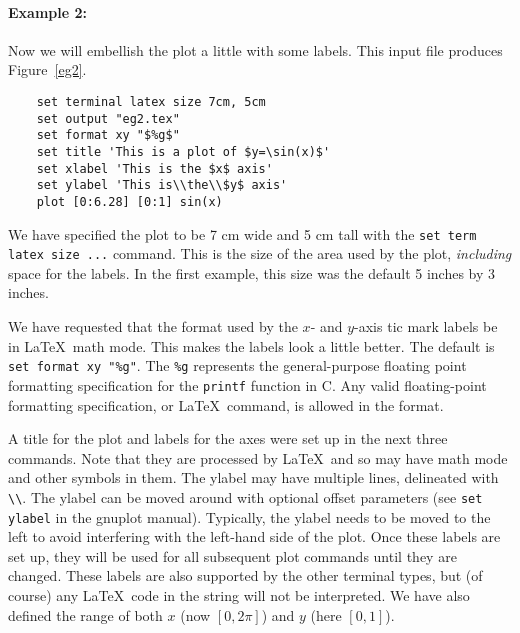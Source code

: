 \paragraph{Example 2:} Now we will embellish the plot a little with
some labels.  This input file produces Figure~\ref{eg2}.

\singlespace
\begin{verbatim}
    set terminal latex size 7cm, 5cm
    set output "eg2.tex"
    set format xy "$%g$"
    set title 'This is a plot of $y=\sin(x)$'
    set xlabel 'This is the $x$ axis'
    set ylabel 'This is\\the\\$y$ axis'
    plot [0:6.28] [0:1] sin(x)
\end{verbatim}
\currentspace


We have specified the plot to be 7 cm wide and 5 cm tall with
the {\tt set term latex size ...} command. This is the size of the 
area used by the plot, {\em including} space for the labels.
In the first example, this size was the default 5 inches by 3 inches.

We have requested that the format used by the $x$- and $y$-axis tic
mark labels be in \LaTeX\ math mode. This makes the labels look a
little better. The default is \verb+set format xy "%g"+. The \verb+%g+
represents the general-purpose floating point formatting specification
for the {\tt printf} function in C. Any valid floating-point
formatting specification, or \LaTeX\ command, is allowed in the
format.

A title for the plot and labels for the axes were set up in the next
three commands.  Note that they are processed by \LaTeX\ and so may
have math mode and other symbols in them. The ylabel may have multiple
lines, delineated with \verb+\\+.  The ylabel can be moved around with
optional offset parameters (see {\tt set ylabel} in the gnuplot
manual). Typically, the ylabel needs to be moved to the left to avoid
interfering with the left-hand side of the plot.  Once these labels
are set up, they will be used for all subsequent plot commands until
they are changed. These labels are also supported by the other
terminal types, but (of course) any \LaTeX\ code in the string will
not be interpreted. We have also defined the range of both $x$ (now
$[0,2\pi]$) and $y$ (here $[0,1]$).

